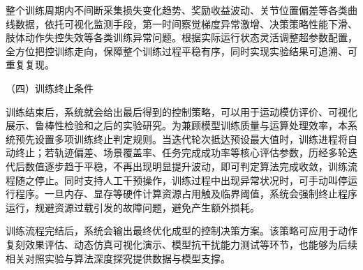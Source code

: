 整个训练周期内不间断采集损失变化趋势、奖励收益波动、关节位置偏差等各类曲线数据，依托可视化监测手段，第一时间察觉梯度异常激增、决策策略性能下滑、肢体动作失控失效等各类训练异常问题。根据实际运行状态灵活调整超参数配置，全方位把控训练走向，保障整个训练过程平稳有序，同时实现实验结果可追溯、可重复复现。

（四）训练终止条件

训练结束后，系统就会给出最后得到的控制策略，可以用于运动模仿评价、可视化展示、鲁棒性检验和之后的实验研究。为兼顾模型训练质量与运算处理效率，本系统预先设置多项训练终止判定规则。当迭代轮次抵达预设最大值时，训练进程将自动终止；若轨迹偏差、场景覆盖率、任务完成成功率等核心评估参数，历经多轮迭代后数值逐步趋于平稳，不再出现明显提升波动，即可判定算法完成收敛，训练流程随之停止。同时支持人工干预操作，训练过程中出现异常状况时，可手动叫停运行程序。一旦内存、显存等硬件计算资源占用触及临界阈值，系统会强制终止程序运行，规避资源过载引发的故障问题，避免产生额外损耗。

训练流程完结后，系统会输出最终优化成型的控制决策方案。该策略可应用于动作复刻效果评估、动态仿真可视化演示、模型抗干扰能力测试等环节，也能够为后续相关对照实验与算法深度探究提供数据与模型支撑。
